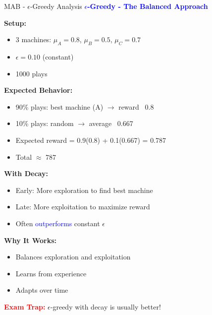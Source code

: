\documentclass[8pt]{beamer}
\begin{document}
\begin{frame}{MAB - $\epsilon$-Greedy Analysis}
\fontsize{6.5}{7.5}\selectfont
\textcolor{blue}{\textbf{$\epsilon$-Greedy - The Balanced Approach}}

\textbf{Setup:}
\begin{itemize}
\item 3 machines: $\mu_A = 0.8$, $\mu_B = 0.5$, $\mu_C = 0.7$
\item $\epsilon = 0.10$ (constant)
\item 1000 plays
\end{itemize}

\textbf{Expected Behavior:}
\begin{itemize}
\item 90\% plays: best machine (A) $\rightarrow$ reward ~0.8
\item 10\% plays: random $\rightarrow$ average ~0.667
\item Expected reward = 0.9(0.8) + 0.1(0.667) = 0.787
\item Total $\approx$ 787
\end{itemize}

\textbf{With Decay:}
\begin{itemize}
\item Early: More exploration to find best machine
\item Late: More exploitation to maximize reward
\item Often \textcolor{blue}{outperforms} constant $\epsilon$
\end{itemize}

\textbf{Why It Works:}
\begin{itemize}
\item Balances exploration and exploitation
\item Learns from experience
\item Adapts over time
\end{itemize}

\textcolor{red}{\textbf{Exam Trap:}} $\epsilon$-greedy with decay is usually better!
\end{frame}
\end{document}
